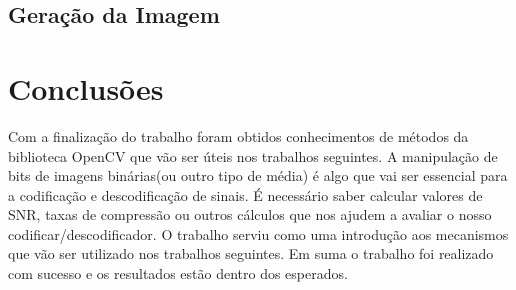 \documentclass[12pt,a4paper]{article}
\begin{document}
\clearpage

\subsection{Geração da Imagem}

\clearpage

\section{Conclusões}
Com a finalização do trabalho foram obtidos conhecimentos de métodos da biblioteca OpenCV que vão ser úteis nos trabalhos seguintes. A manipulação de bits de imagens binárias(ou outro tipo de média) é algo que vai ser essencial para a codificação e descodificação de sinais. É necessário saber calcular valores de SNR, taxas de compressão ou outros cálculos que nos ajudem a avaliar o nosso codificar/descodificador. O trabalho serviu como uma introdução aos mecanismos que vão ser utilizado nos trabalhos seguintes. Em suma o trabalho foi realizado com sucesso e os resultados estão dentro dos esperados.
\end{document}
